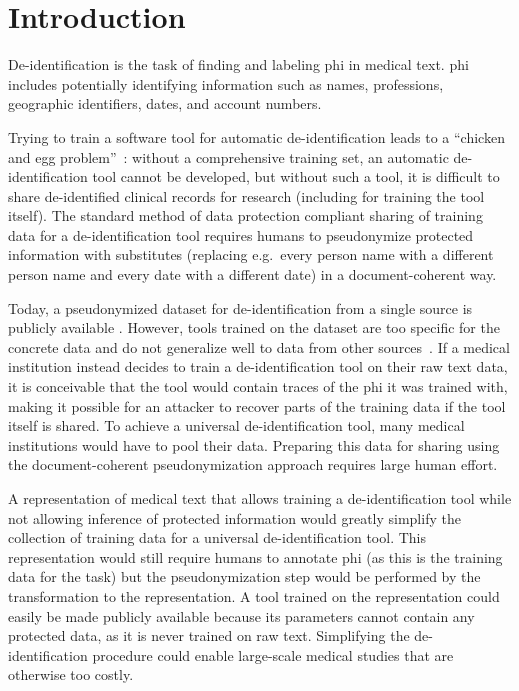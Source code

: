 
\section{Introduction}\label{sec:introduction}
%
De-identification is the task of finding and labeling \ac{phi} in medical text.
%
\Ac{phi} includes potentially identifying information such as names, professions, geographic identifiers, dates, and account numbers.


%
Trying to train a software tool for automatic de-identification leads to a ``chicken and egg problem''~\citep{uzuner2007evaluating}: without a comprehensive training set, an automatic de-identification tool cannot be developed, but without such a tool, it is difficult to share de-identified clinical records for research (including for training the tool itself).
%
The standard method of data protection compliant sharing of training data for a de-identification tool requires humans to pseudonymize protected information with substitutes (replacing e.g.\ every person name with a different person name and every date with a different date) in a document-coherent way.

%
Today, a pseudonymized dataset for de-identification from a single source is publicly available \citep{stubbs2015annotating}.
%
However, tools trained on the dataset are too specific for the concrete data and do not generalize well to data from other sources~\citep{stubbs2017identification}.
%
If a medical institution instead decides to train a de-identification tool on their raw text data, it is conceivable that the tool would contain traces of the \ac{phi} it was trained with, making it possible for an attacker to recover parts of the training data if the tool itself is shared.
%
To achieve a universal de-identification tool, many medical institutions would have to pool their data.
%
Preparing this data for sharing using the document-coherent pseudonymization approach requires large human effort.

%
A representation of medical text that allows training a de-identification tool while not allowing inference of protected information would greatly simplify the collection of training data for a universal de-identification tool.
%
This representation would still require humans to annotate \ac{phi} (as this is the training data for the task) but the pseudonymization step would be performed by the transformation to the representation.
%
A tool trained on the representation could easily be made publicly available because its parameters cannot contain any protected data, as it is never trained on raw text.
%
Simplifying the de-identification procedure could enable large-scale medical studies that are otherwise too costly.

